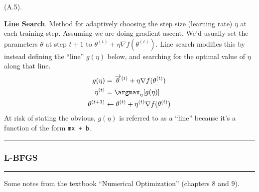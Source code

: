 \documentclass[11pt]{article}
\newcommand\myspace[1][]{\vspace{#1\bigskipamount}}
\newcommand\p{\Needspace{10\baselineskip} \noindent}
\newcommand\subsub[1]{\Needspace{15\baselineskip}\hrule\subsubsection{#1}\hrule}
\begin{document}
\myspace 
\p {} (A.5). 
\begin{compactitem}
	\item \textbf{Line Search}. Method for adaptively choosing the step size (learning rate) $\eta$ at each training step. Assuming we are doing gradient ascent. We'd usually set the parameters $\theta$ at step $t + 1$ to $\theta^{(t)} + \eta \nabla f(\theta^{(t)})$. Line search modifies this by instead defining the ``line'' $g(\eta)$ below, and searching for the optimal value of $\eta$ along that line.
	\begin{align}
		g(\eta) &= \overrightarrow{\theta}^{(t)} + \eta \nabla f(\theta^{(t)}) \\
		\eta^{(t)} &= \argmax_{\eta}[ g(\eta) ] \\
		\theta^{(t + 1)} &\leftarrow \theta^{(t)} + \eta^{(t)} \nabla f(\theta^{(t)})
	\end{align}
	At risk of stating the obvious, $g(\eta)$ is referred to as a ``line'' because it's a function of the form \texttt{mx + b}. 
	
\end{compactitem}

\subsub{L-BFGS}

Some notes from the textbook ``Numerical Optimization'' (chapters 8 and 9).
\end{document}
